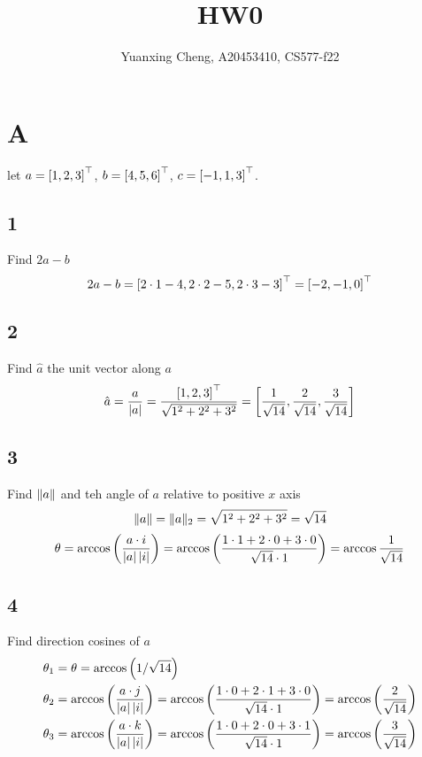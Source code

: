 \documentclass{article}
\title{HW0}
\author{Yuanxing Cheng, A20453410, CS577-f22}
\begin{document}
\maketitle

\section*{A}

let \(a = \left[ 1,2,3 \right]^\top\), \(b = \left[ 4,5,6 \right]^\top\), \(c = \left[ -1,1,3 \right]^\top\).
\subsection*{1}

\begin{myleftlinebox}
    Find \(2a-b\)
    \tcblower
    \[
        2a-b = \left[ 2\cdot 1-4,2\cdot 2-5,2\cdot 3-3  \right]^\top = \left[ -2,-1,0 \right]^\top
    \]
\end{myleftlinebox}


\subsection*{2}
\begin{myleftlinebox}
    Find \(\hat a\) the unit vector along \(a\)
    \tcblower
    \[
        \hat a = \frac{a}{\left\vert a\right\vert} = \frac{\left[ 1,2,3 \right]^\top}{\sqrt{1^2+2^2+3^2}}=\left[ \frac{1}{\sqrt{14}},\frac{2}{\sqrt{14}},\frac{3}{\sqrt{14}} \right]
    \]
\end{myleftlinebox}


\subsection*{3}
\begin{myleftlinebox}
    Find \(\| a \|\) and teh angle of \(a\) relative to positive \(x\) axis
    \tcblower
    \[
        \| a \| = \| a \|_2 = \sqrt{1^2+2^2+3^2} = \sqrt{14}
    \]
    \[
        \theta = \arccos\left( \frac{a\cdot i}{\left\vert a\right\vert\left\vert i\right\vert} \right) = \arccos\left( \frac{1\cdot 1+2\cdot 0+3\cdot 0}{\sqrt{14}\cdot 1} \right) = \arccos\frac{1}{\sqrt{14}}
    \]
\end{myleftlinebox}



\subsection*{4}
\begin{myleftlinebox}
    Find direction cosines of \(a\)
    \tcblower
    \begin{align*}
        \theta_1 &= \theta = \arccos\left( 1/\sqrt{14} \right)\\
        \theta_2 &= \arccos\left( \frac{a\cdot j}{\left\vert a\right\vert\left\vert i\right\vert} \right) = \arccos\left( \frac{1\cdot 0+2\cdot 1+3\cdot 0}{\sqrt{14}\cdot 1} \right) = \arccos\left( \frac{2}{\sqrt{14}} \right)\\
        \theta_3 &= \arccos\left( \frac{a\cdot k}{\left\vert a\right\vert\left\vert i\right\vert} \right) = \arccos\left( \frac{1\cdot 0+2\cdot 0+3\cdot 1}{\sqrt{14}\cdot 1} \right) = \arccos\left( \frac{3}{\sqrt{14}} \right)
    \end{align*}
\end{myleftlinebox}
\end{document}
